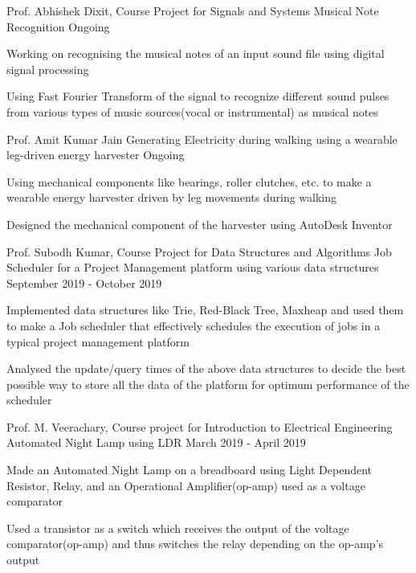 
\begin{cventries}
  \cventry
    {Prof. Abhishek Dixit, Course Project for Signals and Systems}
    {Musical Note Recognition} %
    {} %
    {Ongoing} %
    {
      \begin{cvitems} %
        \item {Working on recognising the musical notes of an input sound file using digital signal processing}
        \item {Using Fast Fourier Transform of the signal to recognize different sound pulses from various types of music sources(vocal or instrumental) as musical notes}
      \end{cvitems}
    }

  \cventry
    {Prof. Amit Kumar Jain}
    {Generating Electricity during walking using a wearable leg-driven energy harvester}
    {}
    {Ongoing}
    {
      \begin{cvitems}
        \item {Using mechanical components like bearings, roller clutches, etc. to make a wearable energy harvester driven by leg movements during walking}
        \item {Designed the mechanical component of the harvester using AutoDesk Inventor}
      \end{cvitems}
    }

  \cventry
    {Prof. Subodh Kumar, Course Project for Data Structures and Algorithms}
    {Job Scheduler for a Project Management platform using various data structures} %
    {}
    {September 2019 - October 2019} %
    {
      \begin{cvitems} %
      	\item {Implemented data structures like Trie, Red-Black Tree, Maxheap and used them to make a Job scheduler that effectively schedules the execution of jobs in a typical project management platform}
      	\item {Analysed the update/query times of the above data structures to decide the best possible way to store all the data of the platform for optimum performance of the scheduler}
      \end{cvitems}
    }

  \cventry
    {Prof. M. Veerachary, Course project for Introduction to Electrical Engineering}
    {Automated Night Lamp using LDR}
    {}
    {March 2019 - April 2019}
    {
      \begin{cvitems}
        \item {Made an Automated Night Lamp on a breadboard using Light Dependent Resistor, Relay, and an Operational Amplifier(op-amp) used as a voltage comparator}
        \item {Used a transistor as a switch which receives the output of the voltage comparator(op-amp) and thus switches the relay depending on the op-amp's output}
      \end{cvitems}
    }


\end{cventries}
